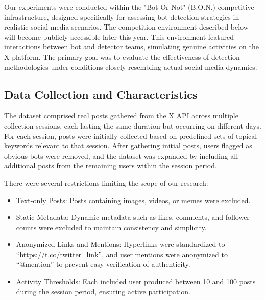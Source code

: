 \documentclass[conference]{IEEEtran}
\begin{document}
Our experiments were conducted within the "Bot Or Not" (B.O.N.) competitive infrastructure, designed specifically for assessing bot detection strategies in realistic social media scenarios. 
The competition environment described below will become publicly accessible later this year. This environment featured interactions between bot and detector teams, simulating genuine activities on the X platform. The primary goal was to evaluate the effectiveness of detection methodologies under conditions closely resembling actual social media dynamics.

\subsection{Data Collection and Characteristics}

The dataset comprised real posts gathered from the X API across multiple collection sessions, 
each lasting the same duration but occurring on different days. For each session, posts were 
initially collected based on predefined sets of topical keywords relevant to that session. 
After gathering initial posts, users flagged as obvious bots were removed, and the dataset was 
expanded by including all additional posts from the remaining users within the session period. 

There were several restrictions limiting the scope of our research:
\begin{itemize}
    \item Text-only Posts: Posts containing images, videos, or memes were excluded.

    \item Static Metadata: Dynamic metadata such as likes, comments, and follower counts were excluded to maintain consistency and simplicity.

    \item Anonymized Links and Mentions: Hyperlinks were standardized to ``https://t.co/twitter\_link'', and user mentions were anonymized to ``@mention'' to prevent easy verification of authenticity.
    
    \item Activity Thresholds: Each included user produced between 10 and 100 posts during the session period, ensuring active participation.
    
\end{itemize}
\end{document}
